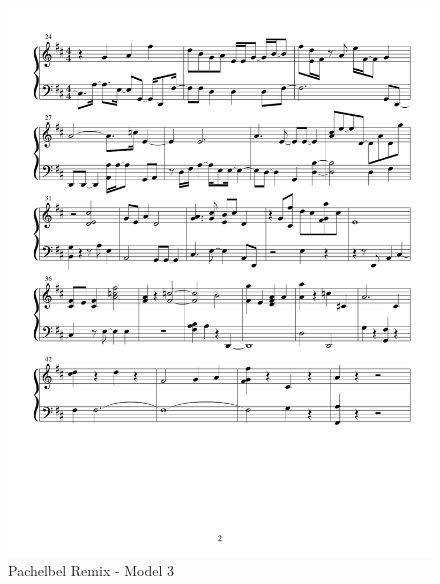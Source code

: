 \documentclass{article} %
\begin{document}
\begin{figure}[H]
\centering

\includegraphics [scale = 0.6] {PachelbelRemix2H-cropped.pdf}
\caption{Pachelbel Remix - Model 3\label{P3}}
\end{figure}
\end{document}
